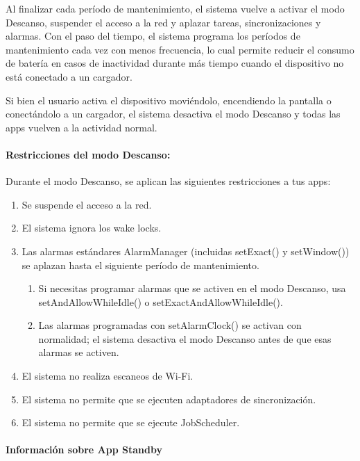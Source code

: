 Al finalizar cada período de mantenimiento, el sistema vuelve a activar el modo Descanso, suspender el acceso a la red y aplazar tareas, sincronizaciones y alarmas. Con el paso del tiempo, el sistema programa los períodos de mantenimiento cada vez con menos frecuencia, lo cual permite reducir el consumo de batería en casos de inactividad durante más tiempo cuando el dispositivo no está conectado a un cargador.

Si bien el usuario activa el dispositivo moviéndolo, encendiendo la pantalla o conectándolo a un cargador, el sistema desactiva el modo Descanso y todas las apps vuelven a la actividad normal.

\paragraph{Restricciones del modo Descanso:}
Durante el modo Descanso, se aplican las siguientes restricciones a tus apps:
\begin{enumerate}
\item Se suspende el acceso a la red.
\item El sistema ignora los wake locks.
\item Las alarmas estándares AlarmManager (incluidas setExact() y setWindow()) se aplazan hasta el siguiente período de mantenimiento.
\begin{enumerate}
\item Si necesitas programar alarmas que se activen en el modo Descanso, usa setAndAllowWhileIdle() o setExactAndAllowWhileIdle().
\item Las alarmas programadas con setAlarmClock() se activan con normalidad; el sistema desactiva el modo Descanso antes de que esas alarmas se activen.
\end{enumerate}
\item El sistema no realiza escaneos de Wi-Fi.
\item El sistema no permite que se ejecuten adaptadores de sincronización.
\item El sistema no permite que se ejecute JobScheduler.
\end{enumerate}

\paragraph{Información sobre App Standby}

